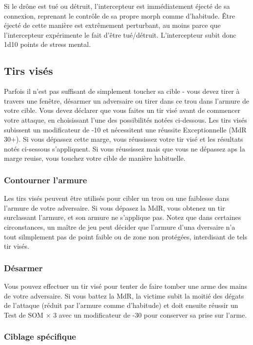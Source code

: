 Si le drône est tué ou détruit, l'intercepteur est immédiatement éjecté de sa connexion, reprenant le contrôle de sa propre morph comme d'habitude. Être éjecté de cette manière est extrêmement perturbant, au moins parce que l'intercepteur expérimente le fait d'être tué/détruit. L'intercepteur subit donc 1d10 points de stress mental. 

\subsection{Tirs visés} \label{sec:called-shots} 

Parfois il n'est pas suffisant de simplement toucher sa cible - vous devez tirer à travers une fenêtre, désarmer un adversaire ou tirer dans ce trou dans l'armure de votre cible. Vous devez déclarer que vous faites un tir visé avant de commencer votre attaque, en choisissant l'une des possibilités notées ci-dessous. Les tirs visés subissent un modificateur de -10 et nécessitent une réussite Exceptionnelle (MdR 30+). Si vous dépassez cette marge, vous réussissez votre tir visé et les résultats notés ci-sessous s'appliquent. Si vous réussissez mais que vous ne dépassez aps la marge reuise, vous touchez votre cible de manière habituelle. 

\subsubsection{Contourner l'armure} 

Les tirs visés peuvent être utilisés pour cibler un trou ou une faiblesse dans l'armure de votre adversaire. Si vous dépasez la MdR, vous obtenez un tir surclassant l'armure, et son armure ne s'applique pas. Notez que dans certaines circonstances, un maître de jeu peut décider que l'armure d'una dversaire n'a tout silmplement pas de point faible ou de zone non protégées, interdisant de tels tir visés. 

\subsubsection{Désarmer} 

Vous pouvez effectuer un tir visé pour tenter de faire tomber une arme des mains de votre adversaire. Si vous battez la MdR, la victime subit la moitié des dégats de l'attaque (réduit par l'armure comme d'habitude) et doit ensuite réussir un Test de SOM $\times$ 3 avec un modificateur de -30 pour conserver sa prise sur l'arme. 

\subsubsection{Ciblage spécifique} 


